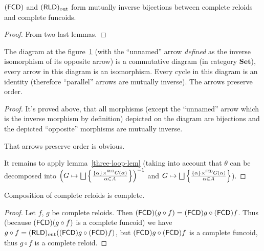 \begin{prop}
$(\mathsf{FCD})$ and $(\mathsf{RLD})_{\mathrm{out}}$ form mutually inverse bijections between
complete reloids and complete funcoids.\end{prop}
\begin{proof}
From two last lemmas.\end{proof}
\begin{thm}
The diagram at the figure~\ref{cmpl-dia} (with the ``unnamed''
arrow \emph{defined} as the inverse isomorphism of its opposite arrow)
is a commutative diagram (in category $\mathbf{Set}$), every arrow
in this diagram is an isomorphism. Every cycle in this diagram is
an identity (therefore ``parallel'' arrows are mutually inverse).
The arrows preserve order.

\begin{figure}[ht]
\caption{\label{cmpl-dia}}


\end{figure}
\end{thm}
\begin{proof}
It's proved above, that all morphisms (except the ``unnamed'' arrow
which is the inverse morphism by definition) depicted on the diagram
are bijections and the depicted ``opposite'' morphisms are mutually
inverse.

That arrows preserve order is obvious.

It remains to apply lemma~\ref{three-loop-lem} (taking into account
that $\theta$ can be decomposed into $\left(G\mapsto\bigsqcup\left\{ \frac{\{\alpha\}\times^{\mathsf{RLD}}G(\alpha)}{\alpha\in A}\right\}\right)^{-1}$
and $G\mapsto\bigsqcup\left\{ \frac{\{\alpha\}\times^{\mathsf{FCD}}G(\alpha)}{\alpha\in A}\right\}$).\end{proof}
\begin{thm}
Composition of complete reloids is complete.\end{thm}
\begin{proof}
Let $f$, $g$ be complete reloids. Then $(\mathsf{FCD})(g\circ f)=(\mathsf{FCD}) g\circ(\mathsf{FCD}) f$.
Thus (because $(\mathsf{FCD})(g\circ f)$ is a complete funcoid) we have $g\circ f=(\mathsf{RLD})_{\mathrm{out}}((\mathsf{FCD}) g\circ(\mathsf{FCD}) f)$,
but $(\mathsf{FCD}) g\circ(\mathsf{FCD}) f$ is a complete funcoid, thus $g\circ f$
is a complete reloid.\end{proof}
